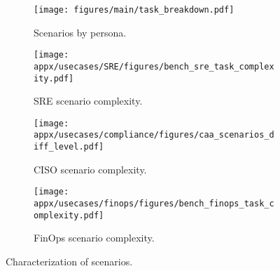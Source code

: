 \begin{figure*}[t]
    \begin{subfigure}{0.23\linewidth}
        \centering
        \texttt{[image: figures/main/task\_breakdown.pdf]}
        \caption{Scenarios by persona.}
        \label{fig:role-task-breakdown}
    \end{subfigure}
    \hfill
    \begin{subfigure}{0.23\linewidth}
        \centering
        \texttt{[image: appx/usecases/SRE/figures/bench\_sre\_task\_complexity.pdf]}
        \caption{SRE scenario complexity.}
        \label{fig:sre-task-difficulty}
    \end{subfigure}
    \hfill
    \begin{subfigure}{0.23\linewidth}
        \centering
        \texttt{[image: appx/usecases/compliance/figures/caa\_scenarios\_diff\_level.pdf]}
        \caption{CISO scenario complexity.}
        \label{fig:ciso-task-difficulty}
    \end{subfigure}
      \hfill
    \begin{subfigure}{0.23\linewidth}
        \centering
        \texttt{[image: appx/usecases/finops/figures/bench\_finops\_task\_complexity.pdf]}
        \caption{FinOps scenario complexity.}
        \label{fig:finops-task-difficulty}
    \end{subfigure}
    \caption{Characterization of \bench scenarios.}
    \label{fig:task-analysis}
\end{figure*}











